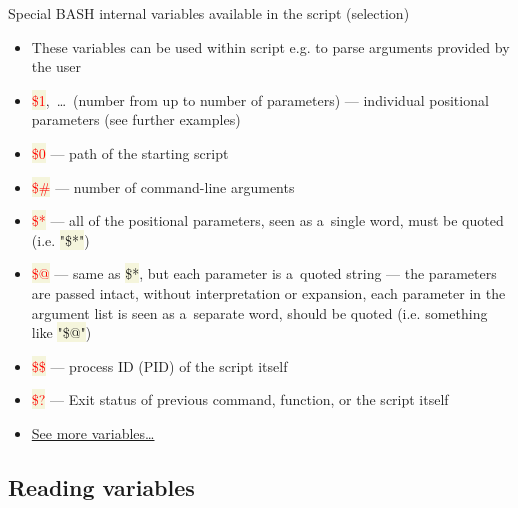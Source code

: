 \documentclass[compress, ucs, xelatex, 11pt, xcolor=svgnames, aspectratio=169,
	hyperref={
		bookmarks=true,
		unicode=true,
		colorlinks=true,
		pdftitle={Linux, command line and MetaCentrum},
		plainpages=false,
		pdfauthor={Vojtech Zeisek},
		pdfsubject={Course about use of Linux command line, writing shell scripts and using MetaCentrum of CESNET},
		pdfcreator={XeLaTeX},
		pdfkeywords={Linux, GNU, BASH, shell, command line, MetaCentrum},
		linkcolor=DarkRed, %
		anchorcolor=DarkBlue, %
		citecolor=Indigo, %
		filecolor=NavyBlue, %
		menucolor=DarkMagenta, %
		urlcolor=DarkBlue, %
		pdftex},
	url={hyphens, lowtilde} %
	]{beamer}
\renewcommand{\texttt}[1]{\colorbox{Beige}{{\ttfamily #1}}}
\renewcommand{\alert}[1]{\textcolor{red}{#1}}
\begin{document}
\begin{frame}{Special BASH internal variables available in the script (selection)}
	\begin{itemize}
		\item These variables can be used within script e.g. to parse arguments provided by the user
		\item \alert{\texttt{\$1}},~\ldots~(number from \texttt{1} up to number of parameters) --- individual positional parameters (see further examples)
		\item \alert{\texttt{\$0}} --- path of the starting script
		\item \alert{\texttt{\$\#}} --- number of command-line arguments
		\item \alert{\texttt{\$*}} --- all of the positional parameters, seen as a~single word, must be quoted (i.e. \texttt{"\$*"})
		\item \alert{\texttt{\$@}} --- same as \texttt{\$*}, but each parameter is a~quoted string --- the parameters are passed intact, without interpretation or expansion, each parameter in the argument list is seen as a~separate word, should be quoted (i.e. something like \texttt{"\$@"})
		\item \alert{\texttt{\$\$}} --- process ID (PID) of the script itself
		\item \alert{\texttt{\$?}} --- Exit status of previous command, function, or the script itself
		\item \href{https://tldp.org/LDP/abs/html/internalvariables.html}{See more variables\ldots}
	\end{itemize}
\end{frame}

\subsection{Reading variables}
\end{document}
